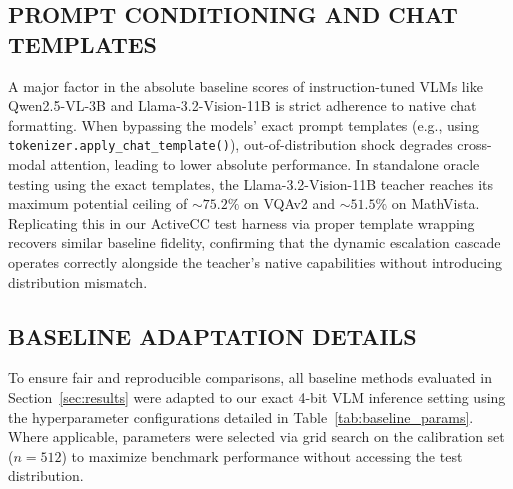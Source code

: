 \documentclass{ieeetmlcn}
\begin{document}
\subsection{PROMPT CONDITIONING AND CHAT TEMPLATES}
A major factor in the absolute baseline scores of instruction-tuned VLMs like Qwen2.5-VL-3B and Llama-3.2-Vision-11B is strict adherence to native chat formatting. When bypassing the models' exact prompt templates (e.g., using \texttt{tokenizer.apply\_chat\_template()}), out-of-distribution shock degrades cross-modal attention, leading to lower absolute performance. 
In standalone oracle testing using the exact templates, the Llama-3.2-Vision-11B teacher reaches its maximum potential ceiling of $\sim\!75.2\%$ on VQAv2 and $\sim\!51.5\%$ on MathVista. Replicating this in our ActiveCC test harness via proper template wrapping recovers similar baseline fidelity, confirming that the dynamic escalation cascade operates correctly alongside the teacher's native capabilities without introducing distribution mismatch.

\subsection{BASELINE ADAPTATION DETAILS}
To ensure fair and reproducible comparisons, all baseline methods evaluated in Section~\ref{sec:results} were adapted to our exact 4-bit VLM inference setting using the hyperparameter configurations detailed in Table~\ref{tab:baseline_params}. Where applicable, parameters were selected via grid search on the calibration set ($n=512$) to maximize benchmark performance without accessing the test distribution.
\end{document}
